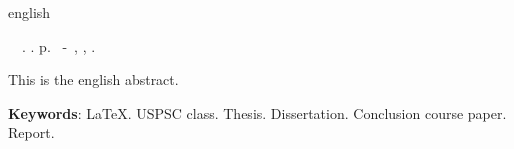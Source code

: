 \begin{resumo}[Abstract]
 \begin{otherlanguage*}{english}
	\begin{flushleft} 
		\setlength{\absparsep}{0pt} %
 		\SingleSpacing  		\imprimirautorabr~~\textbf{\imprimirtitleabstract}.	\imprimirdata.  \pageref{LastPage} p. 
		\imprimirtipotrabalhoabs~-~\imprimirinstituicao, \imprimirlocal, 	\imprimirdata. 
 	\end{flushleft}
	\OnehalfSpacing 
   This is the english abstract.

   \vspace{\onelineskip}
 
   \noindent 
   \textbf{Keywords}: LaTeX. USPSC class. Thesis. Dissertation. Conclusion course paper. Report. 
 \end{otherlanguage*}
\end{resumo}
